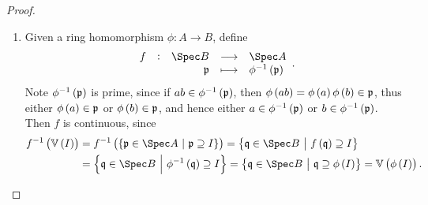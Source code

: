 \begin{proof}
\hfill
\begin{enumerate}
\item Given a ring homomorphism $ \phi : A \to B $, define
$$ \function[f]{\Spec B}{\Spec A}{\ppp}{\phi^{-1}\br{\ppp}}. $$
Note $ \phi^{-1}\br{\ppp} $ is prime, since if $ ab \in \phi^{-1}\br{\ppp} $, then $ \phi\br{ab} = \phi\br{a}\phi\br{b} \in \ppp $, thus either $ \phi\br{a} \in \ppp $ or $ \phi\br{b} \in \ppp $, and hence either $ a \in \phi^{-1}\br{\ppp} $ or $ b \in \phi^{-1}\br{\ppp} $. Then $ f $ is continuous, since
\begin{align*}
f^{-1}\br{\VV\br{I}}
& = f^{-1}\br{\cbr{\ppp \in \Spec A \st \ppp \supseteq I}}
= \cbr{\qqq \in \Spec B \st f\br{\qqq} \supseteq I} \\
& = \cbr{\qqq \in \Spec B \st \phi^{-1}\br{\qqq} \supseteq I}
= \cbr{\qqq \in \Spec B \st \qqq \supseteq \phi\br{I}} = \VV\br{\phi\br{I}}.
\end{align*}

\pagebreak


\end{enumerate}
\end{proof}
